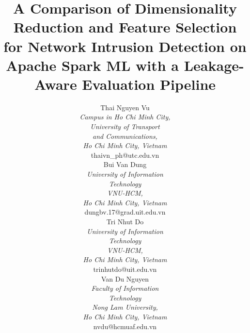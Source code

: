 \documentclass[11pt,conference,a4paper]{IEEEtran}
\begin{document}
\title{A Comparison of Dimensionality Reduction and Feature Selection for Network Intrusion Detection on Apache Spark ML with a Leakage-Aware Evaluation Pipeline}

\author{%
\begin{minipage}[t]{0.24\textwidth}\centering
{\normalsize Thai Nguyen Vu}\\[3pt]
{\itshape\small Campus in Ho Chi Minh City,\\ University of Transport\\ and Communications,\\ Ho Chi Minh City, Vietnam}\\
{\small thaivn\_ph@utc.edu.vn}
\end{minipage}\hfill
\begin{minipage}[t]{0.24\textwidth}\centering
{\normalsize Bui Van Dung}\\[3pt]
{\itshape\small University of Information\\ Technology\\ VNU-HCM,\\ Ho Chi Minh City, Vietnam}\\
{\small dungbv.17@grad.uit.edu.vn}
\end{minipage}\hfill
\begin{minipage}[t]{0.24\textwidth}\centering
{\normalsize Tri Nhut Do}\\[3pt]
{\itshape\small University of Information\\ Technology\\ VNU-HCM,\\ Ho Chi Minh City, Vietnam}\\
{\small trinhutdo@uit.edu.vn}
\end{minipage}\hfill
\begin{minipage}[t]{0.24\textwidth}\centering
{\normalsize Van Du Nguyen}\\[3pt]
{\itshape\small Faculty of Information\\ Technology\\ Nong Lam University,\\ Ho Chi Minh City, Vietnam}\\
{\small nvdu@hcmuaf.edu.vn}
\end{minipage}%
}

\maketitle
\end{document}
